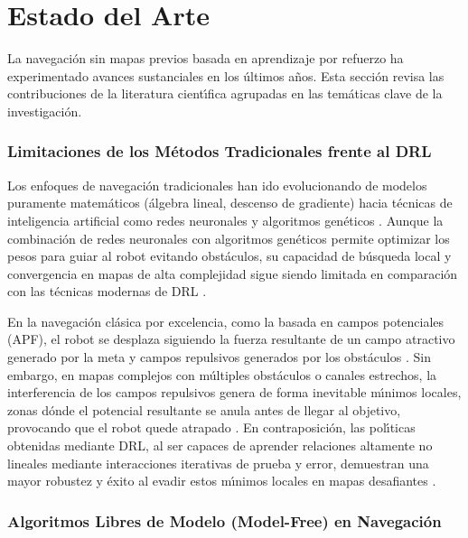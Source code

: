 \chapter{Estado del Arte}


La navegaci\'{o}n sin mapas previos basada en aprendizaje por refuerzo ha experimentado avances sustanciales en los \'{u}ltimos a\~{n}os. Esta secci\'{o}n revisa las contribuciones de la literatura cient\'{\i}fica agrupadas en las tem\'{a}ticas clave de la investigaci\'{o}n.

\subsection{Limitaciones de los M\'{e}todos Tradicionales frente al DRL}

Los enfoques de navegaci\'{o}n tradicionales han ido evolucionando de modelos puramente matem\'{a}ticos (\'{a}lgebra lineal, descenso de gradiente) hacia t\'{e}cnicas de inteligencia artificial como redes neuronales y algoritmos gen\'{e}ticos \cite{AbadPerez2024}. Aunque la combinaci\'{o}n de redes neuronales con algoritmos gen\'{e}ticos permite optimizar los pesos para guiar al robot evitando obst\'{a}culos, su capacidad de b\'{u}squeda local y convergencia en mapas de alta complejidad sigue siendo limitada en comparaci\'{o}n con las t\'{e}cnicas modernas de DRL \cite{AbadPerez2024}.

En la navegaci\'{o}n cl\'{a}sica por excelencia, como la basada en campos potenciales (APF), el robot se desplaza siguiendo la fuerza resultante de un campo atractivo generado por la meta y campos repulsivos generados por los obst\'{a}culos \cite{AbadPerez2024}. Sin embargo, en mapas complejos con m\'{u}ltiples obst\'{a}culos o canales estrechos, la interferencia de los campos repulsivos genera de forma inevitable m\'{\i}nimos locales, zonas d\'{o}nde el potencial resultante se anula antes de llegar al objetivo, provocando que el robot quede atrapado \cite{AbadPerez2024}. En contraposici\'{o}n, las pol\'{\i}ticas obtenidas mediante DRL, al ser capaces de aprender relaciones altamente no lineales mediante interacciones iterativas de prueba y error, demuestran una mayor robustez y \'{e}xito al evadir estos m\'{\i}nimos locales en mapas desafiantes \cite{AbadPerez2024}.

\subsection{Algoritmos Libres de Modelo (Model-Free) en Navegaci\'{o}n}

